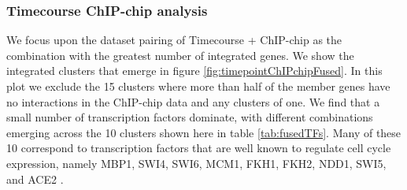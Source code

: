 \documentclass[]{article}
\begin{document}

\subsubsection{Timecourse ChIP-chip analysis}

We focus upon the dataset pairing of Timecourse + ChIP-chip as the combination with the greatest number of integrated genes. We show the integrated clusters that emerge in figure \ref{fig:timepointChIPchipFused}. In this plot we exclude the 15 clusters where more than half of the member genes have no interactions in the ChIP-chip data and any clusters of one. We find that a small number of transcription factors dominate, with different combinations emerging across the 10 clusters shown here in table \ref{tab:fusedTFs}. Many of these 10 correspond to transcription factors that are well known to regulate cell cycle expression, namely MBP1, SWI4, SWI6, MCM1, FKH1, FKH2, NDD1, SWI5, and ACE2 \citep{simon2001serial}.
\end{document}
